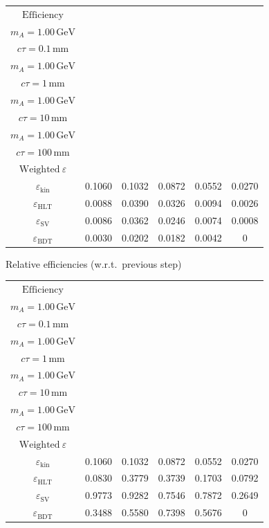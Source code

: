 \documentclass[10pt,a4paper]{article}
\begin{document}
{\begin{tabular}{cccccc}
\toprule
$\mathrm{Efficiency}$ & \shortstack{$m_{\pi}=10\,\mathrm{GeV}$\\$m_{A}=1.00\,\mathrm{GeV}$\\$c\tau=0.1\,\mathrm{mm}$} & \shortstack{$m_{\pi}=10\,\mathrm{GeV}$\\$m_{A}=1.00\,\mathrm{GeV}$\\$c\tau=1\,\mathrm{mm}$} & \shortstack{$m_{\pi}=10\,\mathrm{GeV}$\\$m_{A}=1.00\,\mathrm{GeV}$\\$c\tau=10\,\mathrm{mm}$} & \shortstack{$m_{\pi}=10\,\mathrm{GeV}$\\$m_{A}=1.00\,\mathrm{GeV}$\\$c\tau=100\,\mathrm{mm}$} & \shortstack{$\mathrm{QCD}$\\$\mathrm{Weighted}\ \varepsilon$} \\
\midrule
$\varepsilon_{\mathrm{kin}}$ & 0.1060 & 0.1032 & 0.0872 & 0.0552 & 0.0270\\
$\varepsilon_{\mathrm{HLT}}$ & 0.0088 & 0.0390 & 0.0326 & 0.0094 & 0.0026\\
$\varepsilon_{\mathrm{SV}}$ & 0.0086 & 0.0362 & 0.0246 & 0.0074 & 0.0008\\
$\varepsilon_{\mathrm{BDT}}$ & 0.0030 & 0.0202 & 0.0182 & 0.0042 & $0$\\
\bottomrule
\end{tabular}

\vspace{18pt}

Relative efficiencies (w.r.t.\ previous step)

\begin{tabular}{cccccc}
\toprule
$\mathrm{Efficiency}$ & \shortstack{$m_{\pi}=10\,\mathrm{GeV}$\\$m_{A}=1.00\,\mathrm{GeV}$\\$c\tau=0.1\,\mathrm{mm}$} & \shortstack{$m_{\pi}=10\,\mathrm{GeV}$\\$m_{A}=1.00\,\mathrm{GeV}$\\$c\tau=1\,\mathrm{mm}$} & \shortstack{$m_{\pi}=10\,\mathrm{GeV}$\\$m_{A}=1.00\,\mathrm{GeV}$\\$c\tau=10\,\mathrm{mm}$} & \shortstack{$m_{\pi}=10\,\mathrm{GeV}$\\$m_{A}=1.00\,\mathrm{GeV}$\\$c\tau=100\,\mathrm{mm}$} & \shortstack{$\mathrm{QCD}$\\$\mathrm{Weighted}\ \varepsilon$} \\
\midrule
$\varepsilon_{\mathrm{kin}}$ & 0.1060 & 0.1032 & 0.0872 & 0.0552 & 0.0270\\
$\varepsilon_{\mathrm{HLT}}$ & 0.0830 & 0.3779 & 0.3739 & 0.1703 & 0.0792\\
$\varepsilon_{\mathrm{SV}}$ & 0.9773 & 0.9282 & 0.7546 & 0.7872 & 0.2649\\
$\varepsilon_{\mathrm{BDT}}$ & 0.3488 & 0.5580 & 0.7398 & 0.5676 & $0$\\
\bottomrule
\end{tabular}

}
\end{document}
